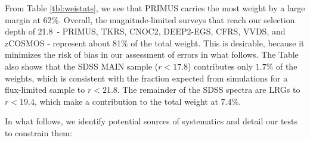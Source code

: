 \documentclass[preprint]{aastex}
\newcommand{\rmax}{21.8}
\begin{document}
From Table \ref{tbl:weistats}, we see that PRIMUS carries the most weight by a
large margin at 62\%.  Overall, the magnitude-limited surveys that reach our
selection depth of \rmax\ - PRIMUS, TKRS, CNOC2, DEEP2-EGS, CFRS, VVDS, and
zCOSMOS - represent about 81$\%$ of the total weight.  
This is desirable,
because it minimizes the risk of bias in our assessment of errors in what follows.
The Table also shows that the SDSS MAIN sample ($r<17.8$) contributes only $1.7\%$ of the weights, which
is consistent with the fraction expected from simulations for a flux-limited sample 
to $r<21.8$.
The remainder of the SDSS spectra are LRGs to $r<19.4$, which make a 
contribution to the total weight at 7.4\%.

In what follows, we identify potential sources of systematics and detail our
tests to constrain them:
\end{document}
